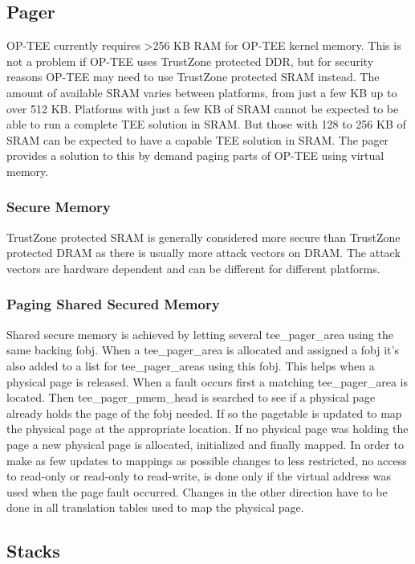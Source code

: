 \documentclass{article}
\begin{document}
\subsection{Pager}

OP-TEE currently requires >256 KB RAM for OP-TEE kernel memory. This is not a problem if OP-TEE uses TrustZone protected DDR, but for security reasons OP-TEE may need to use TrustZone protected SRAM instead. The amount of available SRAM varies between platforms, from just a few KB up to over 512 KB. Platforms with just a few KB of SRAM cannot be expected to be able to run a complete TEE solution in SRAM. But those with 128 to 256 KB of SRAM can be expected to have a capable TEE solution in SRAM. The pager provides a solution to this by demand paging parts of OP-TEE using virtual memory.

\subsubsection{Secure Memory}

TrustZone protected SRAM is generally considered more secure than TrustZone protected DRAM as there is usually more attack vectors on DRAM. The attack vectors are hardware dependent and can be different for different platforms.

\subsubsection{Paging Shared Secured Memory}

Shared secure memory is achieved by letting several tee\_pager\_area using the same backing fobj. When a tee\_pager\_area is allocated and assigned a fobj it’s also added to a list for tee\_pager\_areas using this fobj. This helps when a physical page is released. When a fault occurs first a matching tee\_pager\_area is located. Then tee\_pager\_pmem\_head is searched to see if a physical page already holds the page of the fobj needed. If so the pagetable is updated to map the physical page at the appropriate location. If no physical page was holding the page a new physical page is allocated, initialized and finally mapped. In order to make as few updates to mappings as possible changes to less restricted, no access to read-only or read-only to read-write, is done only if the virtual address was used when the page fault occurred. Changes in the other direction have to be done in all translation tables used to map the physical page.

\subsection{Stacks}
\end{document}
